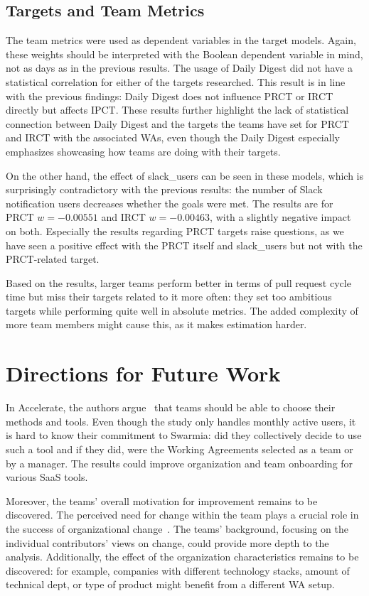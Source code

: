 \subsection{Targets and Team Metrics}

The team metrics were used as dependent variables in the target models. Again, these weights should be interpreted with the Boolean dependent variable in mind, not as days as in the previous results. The usage of Daily Digest did not have a statistical correlation for either of the targets researched. This result is in line with the previous findings: Daily Digest does not influence PRCT or IRCT directly but affects IPCT. These results further highlight the lack of statistical connection between Daily Digest and the targets the teams have set for PRCT and IRCT with the associated WAs, even though the Daily Digest especially emphasizes showcasing how teams are doing with their targets. 

On the other hand, the effect of slack\_users can be seen in these models, which is surprisingly contradictory with the previous results: the number of Slack notification users decreases whether the goals were met. The results are for PRCT $w=-0.00551$ and IRCT $w=-0.00463$, with a slightly negative impact on both. Especially the results regarding PRCT targets raise questions, as we have seen a positive effect with the PRCT itself and slack\_users but not with the PRCT-related target.

Based on the results, larger teams perform better in terms of pull request cycle time but miss their targets related to it more often: they set too ambitious targets while performing quite well in absolute metrics. The added complexity of more team members might cause this, as it makes estimation harder. 

\section{Directions for Future Work}

In Accelerate, the authors argue~\cite{forsgren_accelerate_2018} that teams should be able to choose their methods and tools. Even though the study only handles monthly active users, it is hard to know their commitment to Swarmia: did they collectively decide to use such a tool and if they did, were the Working Agreements selected as a team or by a manager. The results could improve organization and team onboarding for various SaaS tools. 

Moreover, the teams' overall motivation for improvement remains to be discovered. The perceived need for change within the team plays a crucial role in the success of organizational change~\cite{lenberg_initial_2017}. The teams' background, focusing on the individual contributors' views on change, could provide more depth to the analysis. Additionally, the effect of the organization characteristics remains to be discovered: for example, companies with different technology stacks, amount of technical dept, or type of product might benefit from a different WA setup.

